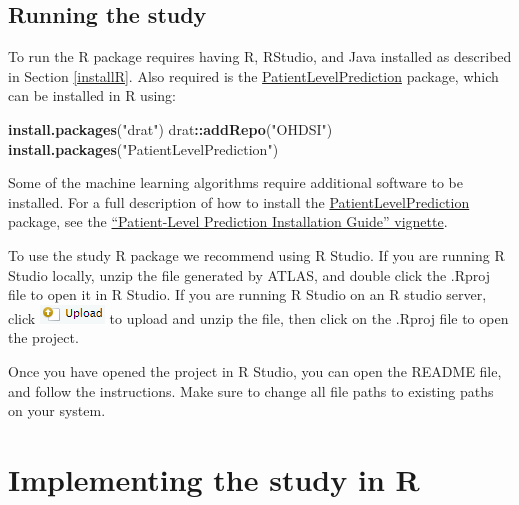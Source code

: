 \documentclass[11pt]{book}
\newenvironment{Shaded}{\begin{snugshade}}{\end{snugshade}}
\newcommand{\KeywordTok}[1]{\textcolor[rgb]{0.13,0.29,0.53}{\textbf{#1}}}
\newcommand{\NormalTok}[1]{#1}
\newcommand{\OperatorTok}[1]{\textcolor[rgb]{0.81,0.36,0.00}{\textbf{#1}}}
\newcommand{\StringTok}[1]{\textcolor[rgb]{0.31,0.60,0.02}{#1}}
\theoremstyle{definition}
\theoremstyle{definition}
\theoremstyle{definition}
\theoremstyle{remark}
\begin{document}
\hypertarget{running-the-study}{%
\subsection{Running the study}\label{running-the-study}}

To run the R package requires having R, RStudio, and Java installed as described in Section \ref{installR}. Also required is the \href{https://ohdsi.github.io/PatientLevelPrediction/}{PatientLevelPrediction} package, which can be installed in R using:

\begin{Shaded}
\begin{Highlighting}[]
\KeywordTok{install.packages}\NormalTok{(}\StringTok{"drat"}\NormalTok{)}
\NormalTok{drat}\OperatorTok{::}\KeywordTok{addRepo}\NormalTok{(}\StringTok{"OHDSI"}\NormalTok{)}
\KeywordTok{install.packages}\NormalTok{(}\StringTok{"PatientLevelPrediction"}\NormalTok{)}
\end{Highlighting}
\end{Shaded}

Some of the machine learning algorithms require additional software to be installed. For a full description of how to install the \href{https://ohdsi.github.io/PatientLevelPrediction/}{PatientLevelPrediction} package, see the \href{https://ohdsi.github.io/PatientLevelPrediction/articles/InstallationGuide.html}{``Patient-Level Prediction Installation Guide'' vignette}.

To use the study R package we recommend using R Studio. If you are running R Studio locally, unzip the file generated by ATLAS, and double click the .Rproj file to open it in R Studio. If you are running R Studio on an R studio server, click \includegraphics{images/PopulationLevelEstimation/upload.png} to upload and unzip the file, then click on the .Rproj file to open the project.

Once you have opened the project in R Studio, you can open the README file, and follow the instructions. Make sure to change all file paths to existing paths on your system.

\hypertarget{implementing-the-study-in-r}{%
\section{Implementing the study in R}\label{implementing-the-study-in-r}}
\end{document}
